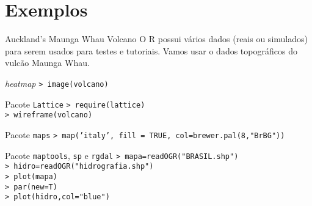 \documentclass{beamer}
\begin{document}
\section{Exemplos}

\begin{frame}{Auckland's Maunga Whau Volcano}
  O R possui vários dados (reais ou simulados) para serem usados para testes
  e tutoriais. Vamos usar o dados topográficos do vulcão Maunga Whau.

  \begin{center}
  \end{center}
  
\end{frame}

\begin{frame}{\textit{heatmap}}
  \texttt{> image(volcano)}
  \begin{center}
    \end{center}

\end{frame}

\begin{frame}{Pacote \texttt{Lattice}}
   \texttt{> require(lattice)\\
> wireframe(volcano)}
  \begin{center}
    \end{center}
\end{frame}

\begin{frame}{Pacote \texttt{maps}}
\texttt{> map('italy', fill = TRUE, col=brewer.pal(8,"BrBG"))}
\begin{center}
   
\end{center}
\end{frame}

\begin{frame}{Pacote \texttt{maptools}, \texttt{sp} e \texttt{rgdal}}
\texttt{> mapa=readOGR("BRASIL.shp")\\
> hidro=readOGR("hidrografia.shp")\\
> plot(mapa)\\
> par(new=T)\\
> plot(hidro,col="blue")}
\begin{center}
   
\end{center}
\end{frame}
\end{document}

